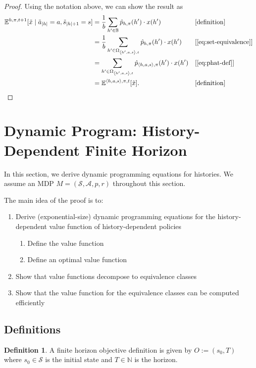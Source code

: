 \documentclass[letterpaper]{article}
\theoremstyle{plain}
\theoremstyle{definition}
\newtheorem{definition}[theorem]{Definition}
\theoremstyle{remark}
\newcommand{\Nats}{\mathbb{N}}
\newcommand{\E}{\mathbb{E}}
\newcommand{\why}[1]{\text{[#1]}}
\newcommand{\lean}[1]{\textcolor{blue}{(\emph{LEAN}: \texttt{#1})}}
\newcommand{\leanok}{}
\begin{document}
\begin{proof}
  Using the notation above, we can show the result as
  \begin{align*}
  \E^{h,\pi,t+1}[\tilde{x} \mid \tilde{a}_{|h|} = a, \tilde{s}_{|h|+1} = s]
  &= \frac{1}{b} \sum_{h'\in \mathbb{B}} \hat{p}_{h,\pi}(h') \cdot x(h')
  && \why{definition}\\
  &= \frac{1}{b} \sum_{h'\in \Omega_{\left< h', a, s \right>, t}} \hat{p}_{h,\pi}(h') \cdot x(h')
  && \why{\cref{eq:set-equivalence}} \\
  &= \sum_{h'\in \Omega_{\left< h', a, s \right>, t}} \hat{p}_{\left<h, a,s  \right>,\pi}(h') \cdot x(h')
  && \why{\cref{eq:phat-def}} \\
  &= \E^{\langle h, a, s\rangle,\pi,t}[\tilde{x}]. && \why{definition}
  \end{align*}
\end{proof}

\section{Dynamic Program: History-Dependent Finite Horizon}

In this section, we derive dynamic programming equations for histories. We assume an MDP $M = (\mathcal{S}, \mathcal{A}, p, r)$ throughout this section.

The main idea of the proof is to:
\begin{enumerate}
\item Derive (exponential-size) dynamic programming equations for the history-dependent value function of history-dependent policies
  \begin{enumerate}
    \item Define the value function
    \item Define an optimal value function
  \end{enumerate}
\item Show that value functions decompose to equivalence classes
\item Show that the value function for the equivalence classes can be computed efficiently
\end{enumerate}

\subsection{Definitions}

\begin{definition} \label{def:ObjectiveFH}
  A finite horizon objective definition is given by $O := (s_0, T)$ where $s_0\in \mathcal{S}$ is the initial state and $T\in \Nats$ is the horizon.
\end{definition}
\end{document}

